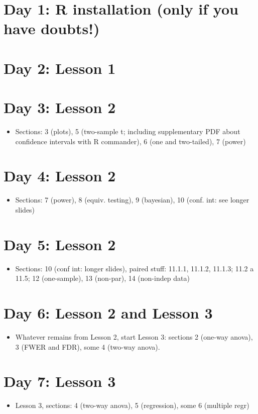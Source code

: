 \documentclass[11pt]{article}
\author{Ramon Diaz-Uriarte}
\date{\today}
\title{}
\begin{document}
\section*{Day 1: R installation (only if you have doubts!)}
\label{sec:org36c5514}

\section*{Day 2: Lesson 1}
\label{sec:orgda9273f}

\section*{Day 3: Lesson 2}
\label{sec:org68d7052}
\begin{itemize}
\item Sections: 3 (plots), 5 (two-sample t; including supplementary PDF about confidence intervals with R commander), 6 (one and two-tailed), 7 (power)
\end{itemize}
\section*{Day 4: Lesson 2}
\label{sec:orgd2e38ff}
\begin{itemize}
\item Sections: 7 (power), 8 (equiv. testing), 9 (bayesian), 10 (conf. int: see longer slides)
\end{itemize}
\section*{Day 5: Lesson 2}
\label{sec:orge6c5021}
\begin{itemize}
\item Sections: 10 (conf int: longer slides), paired stuff: 11.1.1, 11.1.2, 11.1.3; 11.2 a 11.5;  12 (one-sample), 13 (non-par), 14 (non-indep data)
\end{itemize}
\section*{Day 6: Lesson 2 and Lesson 3}
\label{sec:orgbf2d38a}
\begin{itemize}
\item Whatever remains from Lesson 2, start Lesson 3: sections 2 (one-way anova), 3 (FWER and FDR), some 4 (two-way anova).
\end{itemize}
\section*{Day 7: Lesson 3}
\label{sec:org8138e78}
\begin{itemize}
\item Lesson 3, sections: 4 (two-way anova), 5 (regression), some 6 (multiple regr)
\end{itemize}
\end{document}
